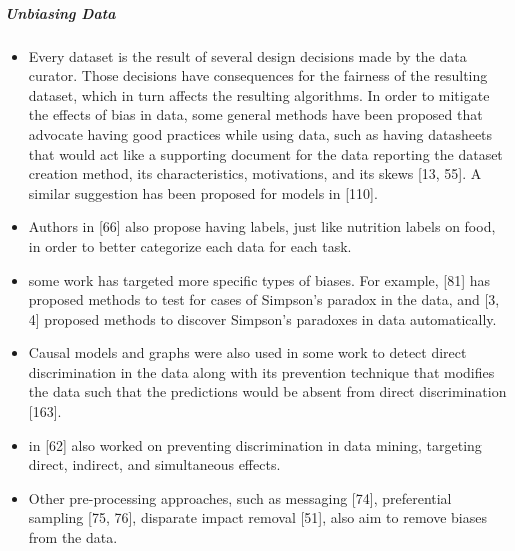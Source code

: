\documentclass[12pt, a4paper, oneside]{book}   	%
\begin{document}
			\subparagraph{Unbiasing Data}
				\begin{itemize}
					\item Every dataset is the result of several design decisions made by the data curator. Those decisions have consequences for the fairness of the resulting dataset, which in turn affects the resulting algorithms. In order to mitigate the effects of bias in data, some general methods have been proposed that advocate having good practices while using data, such as having datasheets that would act like a supporting document for the data reporting the dataset creation method, its characteristics, motivations, and its skews [13, 55]. A similar suggestion has been proposed for models in [110].\autocite{Mehrabi_2021}
					\item Authors in [66] also propose having labels, just like nutrition labels on food, in order to better categorize each data for each task. \autocite{Mehrabi_2021}
					\item some work has targeted more specific types of biases. For example, [81] has proposed methods to test for cases of Simpson’s paradox in the data, and [3, 4] proposed methods to discover Simpson’s paradoxes in data automatically. \autocite{Mehrabi_2021}
					\item Causal models and graphs were also used in some work to detect direct discrimination in the data along with its prevention technique that modifies the data such that the predictions would be absent from direct discrimination [163].\autocite{Mehrabi_2021}
					\item in [62] also worked on preventing discrimination in data mining, targeting direct, indirect, and simultaneous effects.\autocite{Mehrabi_2021}
					\item Other pre-processing approaches, such as messaging [74], preferential sampling [75, 76], disparate impact removal [51], also aim to remove biases from the data. \autocite{Mehrabi_2021}
				\end{itemize}
			
\end{document}
